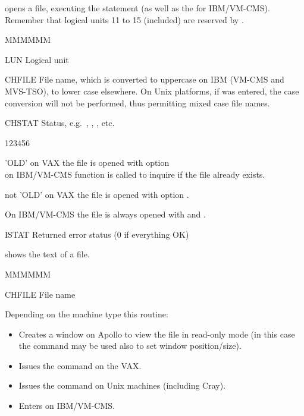 
\Action opens a  file, executing the  statement
(as well as the  for IBM/VM-CMS). 
Remember that logical units 11 to 15 (included) are
reserved by \KUIP{}.
\Pdesc\begin{DLtt}{MMMMMM}
\item[LUN] Logical unit
\item[CHFILE] File name, which is 
converted to uppercase on IBM (VM-CMS and MVS-TSO), to lower case elsewhere.
On Unix platforms, if  was entered,
the case conversion will not be performed,
thus permitting mixed case file names.
\item[CHSTAT] Status, e.g.\ , , , etc.
\begin{DLtt}{123456}
\item['OLD'] on VAX the file is opened with option \\
on IBM/VM-CMS function  is called to inquire if the file
already exists.
\item[{\rm not } 'OLD'] on VAX the file is opened with option .
\end{DLtt}
On IBM/VM-CMS the file is always opened with  and .
\item[ISTAT] Returned error status (0 if everything OK)
\end{DLtt}


\Action shows the text of a file.
\Pdesc\begin{DLtt}{MMMMMM}
\item[CHFILE] File name
\end{DLtt}

Depending on the machine type this routine:
\begin{itemize} 
\item Creates a  window on Apollo to view the
file in read-only mode 
(in this case the command  may be used also
to set window position/size).
\item Issues the command  on the VAX.
\item Issues the command  on Unix machines (including Cray).
\item Enters  on IBM/VM-CMS.
\end{itemize}



